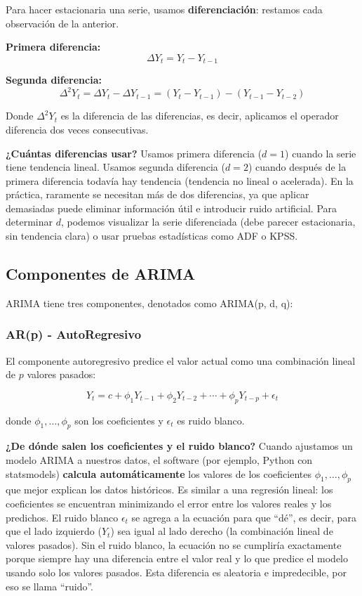 \documentclass[12pt]{article}
\begin{document}
Para hacer estacionaria una serie, usamos \textbf{diferenciación}: restamos cada observación de la anterior.

\vspace{0.5em}

\textbf{Primera diferencia:}
\[
\Delta Y_t = Y_t - Y_{t-1}
\]

\textbf{Segunda diferencia:}
\[
\Delta^2 Y_t = \Delta Y_t - \Delta Y_{t-1} = (Y_t - Y_{t-1}) - (Y_{t-1} - Y_{t-2})
\]

Donde $\Delta^2 Y_t$ es la diferencia de las diferencias, es decir, aplicamos el operador diferencia dos veces consecutivas.

\vspace{0.5em}

\textbf{¿Cuántas diferencias usar?} Usamos primera diferencia ($d=1$) cuando la serie tiene tendencia lineal. Usamos segunda diferencia ($d=2$) cuando después de la primera diferencia todavía hay tendencia (tendencia no lineal o acelerada). En la práctica, raramente se necesitan más de dos diferencias, ya que aplicar demasiadas puede eliminar información útil e introducir ruido artificial. Para determinar $d$, podemos visualizar la serie diferenciada (debe parecer estacionaria, sin tendencia clara) o usar pruebas estadísticas como ADF o KPSS.

\subsection{Componentes de ARIMA}

ARIMA tiene tres componentes, denotados como ARIMA(p, d, q):

\subsubsection{AR(p) - AutoRegresivo}

El componente autoregresivo predice el valor actual como una combinación lineal de $p$ valores pasados:

\[
Y_t = c + \phi_1 Y_{t-1} + \phi_2 Y_{t-2} + \cdots + \phi_p Y_{t-p} + \epsilon_t
\]

donde $\phi_1, \ldots, \phi_p$ son los coeficientes y $\epsilon_t$ es ruido blanco.

\vspace{0.5em}

\textbf{¿De dónde salen los coeficientes y el ruido blanco?} Cuando ajustamos un modelo ARIMA a nuestros datos, el software (por ejemplo, Python con statsmodels) \textbf{calcula automáticamente} los valores de los coeficientes $\phi_1, \ldots, \phi_p$ que mejor explican los datos históricos. Es similar a una regresión lineal: los coeficientes se encuentran minimizando el error entre los valores reales y los predichos. El ruido blanco $\epsilon_t$ se agrega a la ecuación para que ``dé'', es decir, para que el lado izquierdo ($Y_t$) sea igual al lado derecho (la combinación lineal de valores pasados). Sin el ruido blanco, la ecuación no se cumpliría exactamente porque siempre hay una diferencia entre el valor real y lo que predice el modelo usando solo los valores pasados. Esta diferencia es aleatoria e impredecible, por eso se llama ``ruido''.
\end{document}
